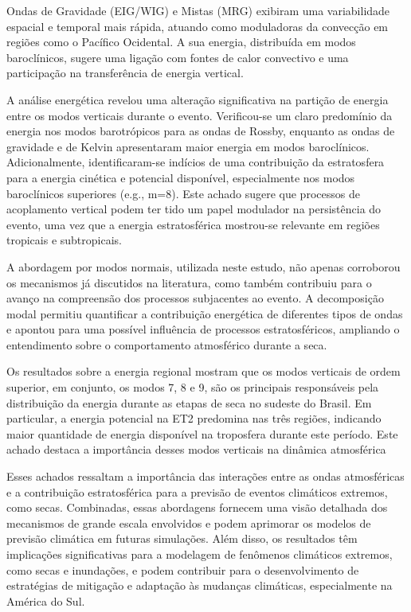 Ondas de Gravidade (EIG/WIG) e Mistas (MRG) exibiram uma variabilidade espacial e temporal mais rápida, atuando como moduladoras da convecção em regiões como o Pacífico Ocidental. A sua energia, distribuída em modos baroclínicos, sugere uma ligação com fontes de calor convectivo e uma participação na transferência de energia vertical.

A análise energética revelou uma alteração significativa na partição de energia entre os modos verticais durante o evento. Verificou-se um claro predomínio da energia nos modos barotrópicos para as ondas de Rossby, enquanto as ondas de gravidade e de Kelvin apresentaram maior energia em modos baroclínicos. Adicionalmente, identificaram-se indícios de uma contribuição da estratosfera para a energia cinética e potencial disponível, especialmente nos modos baroclínicos superiores (e.g., m=8). Este achado sugere que processos de acoplamento vertical podem ter tido um papel modulador na persistência do evento, uma vez que a energia estratosférica mostrou-se relevante em regiões tropicais e subtropicais.

A abordagem por modos normais, utilizada neste estudo, não apenas corroborou os mecanismos já discutidos na literatura, como também contribuiu para o avanço na compreensão dos processos subjacentes ao evento. A decomposição modal permitiu quantificar a contribuição energética de diferentes tipos de ondas e apontou para uma possível influência de processos estratosféricos, ampliando o entendimento sobre o comportamento atmosférico durante a seca.

Os resultados sobre a energia regional mostram que os modos verticais de ordem superior, em conjunto, os modos 7, 8 e 9, são os principais responsáveis pela distribuição da energia durante as etapas de seca no sudeste do Brasil. Em particular, a energia potencial na ET2 predomina nas três regiões, indicando maior quantidade de energia disponível na troposfera durante este período. Este achado destaca a importância desses modos verticais na dinâmica atmosférica

Esses achados ressaltam a importância das interações entre as ondas atmosféricas e a contribuição estratosférica para a previsão de eventos climáticos extremos, como secas. Combinadas, essas abordagens fornecem uma visão detalhada dos mecanismos de grande escala envolvidos e podem aprimorar os modelos de previsão climática em futuras simulações. Além disso, os resultados têm implicações significativas para a modelagem de fenômenos climáticos extremos, como secas e inundações, e podem contribuir para o desenvolvimento de estratégias de mitigação e adaptação às mudanças climáticas, especialmente na América do Sul.
